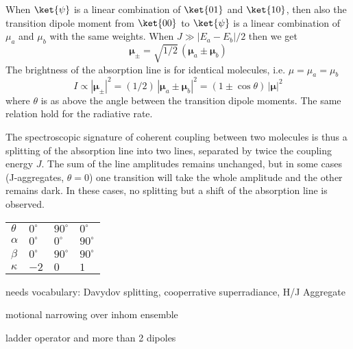 When $\ket{\psi}$ is a linear combination of $\ket{01}$ and $\ket{10}$, then also the transition dipole moment from $\ket{00}$ to $\ket{\psi}$ is a linear combination of $\mu_a$ and $\mu_b$ with the same weights. When $J \gg |E_a - E_b| / 2$ then we get
\[
 \boldsymbol{\mu}_{\pm} = \sqrt{1/2} \, \left( \boldsymbol{\mu}_a \pm  \boldsymbol{\mu}_b  \right) 
\]
The brightness of the absorption line is for identical molecules, i.e. $\mu = \mu_a = \mu_b$
\[
 I \propto |\boldsymbol{\mu}_{\pm}|^2 = (1/2) \, \left| \boldsymbol{\mu}_a \pm  \boldsymbol{\mu}_b  \right|^2 =  \left( 1 \pm \cos \theta \right) \, \left| \boldsymbol{\mu}   \right| ^2 
\]
where $\theta$ is as above the angle between the transition dipole moments. The same relation hold for the radiative rate.

The spectroscopic signature of coherent coupling between two molecules is thus a splitting of the absorption line into two lines, separated by twice the coupling energy $J$. The sum of the line amplitudes remains unchanged, but in some cases (J-aggregates, $\theta = 0$) one transition will take the whole amplitude and the other remains dark. In these cases, no splitting but a shift of the absorption line is observed. 

\begin{tabular}{llll}
$\theta$	&	$0^\circ$ & $90^\circ$ & $0^\circ$  \\
$\alpha$ & $0^\circ$ & $0^\circ$ & $90^\circ$  \\
$\beta$ & $0^\circ$ & $90^\circ$ & $90^\circ$  \\
$\kappa$  & $-2	$	& 	 $	0	$				& $1$   \\
\end{tabular}

needs vocabulary: Davydov splitting, cooperrative superradiance, H/J Aggregate

motional narrowing over inhom ensemble

ladder operator and more than 2 dipoles


